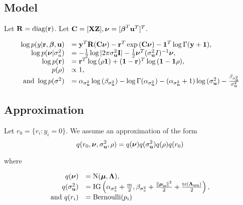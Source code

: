 \documentclass{article}[12pt]
\begin{document}


\subsection{Model}
Let ${\bf R} = \text{diag}{({\bf r})}$. Let ${\bf C} = [{\bf X} {\bf Z}], {\boldsymbol \nu} = [{\boldsymbol \beta}^T {\bf u}^T]^T$.

$$
\begin{array}{rl}
\log{p(y|{\bf r}, {\boldsymbol\beta}, {\bf u})} &= {\bf y}^T {\bf R} ({\bf C}{\boldsymbol \nu}) - {\bf r}^T \exp{({\bf C}{\boldsymbol\nu})} - {\bf 1}^T \log{\Gamma{({\bf y}+ {\bf1})}}, \\
\log{p({\boldsymbol\nu}|\sigma_{u}^2)} &= - {\frac{1}{2}} \log{|2\pi \sigma_{{\bf u}}^2 {\bf I}|} - {\frac{1}{2}} {\boldsymbol \nu}^T(\sigma_{{\bf u}}^2 I)^{-1} {\boldsymbol \nu}, \\
\log{p({\bf r})} &= {\bf r}^T \log{(\rho {\bf1})} + ({\bf 1} - {\bf r})^T\log{({\bf1}- {\bf1}\rho)}, \\
p(\rho) &\propto 1, \\
\mbox{and } \log{p(\sigma^2)} &= \alpha_{\sigma_{\bf u}^2} \log{(\beta_{\sigma_{\bf u}^2})} - \log{\Gamma{(\alpha_{\sigma_{\bf u}^2})}} - (\alpha_{\sigma_{\bf u}^2} + 1) \log{(\sigma_{{\bf u}}^2)} - \frac{\beta_{\sigma_{\bf u}^2}}{\sigma_{{\bf u}}^2}\\
\end{array}
$$

\subsection{Approximation}
Let $r_0 = \{ r_i : y_i = 0 \}$.
We assume an approximation of the form
$$
q(r_0, {\boldsymbol \nu}, \sigma_{{\bf u}}^2, \rho) = q({\boldsymbol \nu}) q(\sigma_{{\bf u}}^2) q(\rho) q(r_0) \\
$$

\noindent where

$$
\begin{array}{rl}
q({\boldsymbol \nu}) &= \mbox{N}({\boldsymbol \mu}, {\boldsymbol \Lambda}), \\
q(\sigma_{{\bf u}}^2) &= \mbox{IG}\left(\alpha_{\sigma_u^2} + \frac{m}{2}, \beta_{\sigma_u^2} + \frac{\|{\boldsymbol \mu}_{\bf u}\|^2}{2} + \frac{\text{tr}({\boldsymbol \Lambda}_{{\bf u}{\bf u}})}{2}\right), \\
\mbox{and } q(r_i) &= \text{Bernoulli} (p_i)
\end{array}
$$
\end{document}
